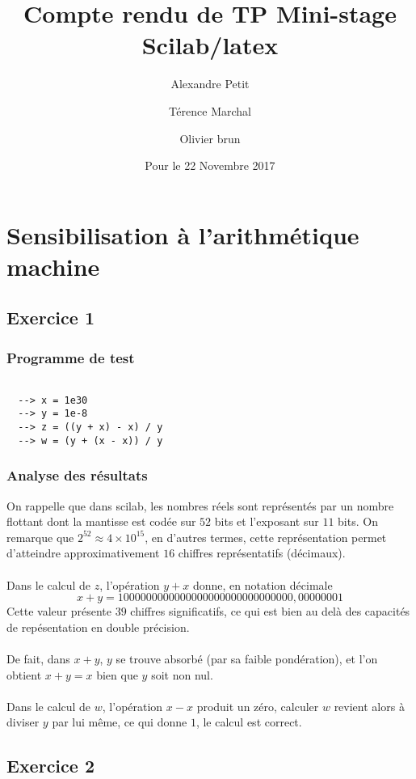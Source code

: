 \documentclass[a4paper,12pt]{article}
\title{Compte rendu de TP Mini-stage Scilab/latex}
\author{Alexandre Petit \and Térence Marchal \and Olivier brun }
\date{Pour le 22 Novembre 2017}
\begin{document}
\maketitle
\section{ Sensibilisation à l'arithmétique machine}
\subsection{ Exercice 1}

\subsubsection{Programme de test}
\begin{verbatim}

  --> x = 1e30
  --> y = 1e-8
  --> z = ((y + x) - x) / y
  --> w = (y + (x - x)) / y
\end{verbatim}

\subsubsection{Analyse des résultats}
On rappelle que dans scilab, les nombres réels sont représentés par un nombre flottant dont la mantisse est codée sur $52$ bits et l'exposant sur $11$ bits. On remarque que $2^{52} \approx 4 \times 10^{15}$, en d'autres termes, cette représentation permet d'atteindre approximativement $16$ chiffres représentatifs (décimaux). \\\\
Dans le calcul de $z$, l'opération $y + x$ donne, en notation décimale
$$
  x + y = 1000000000000000000000000000000,00000001
$$
\newline
Cette valeur présente $39$ chiffres significatifs, ce qui est bien au delà des capacités de repésentation en double précision.\\\\
De fait, dans $x + y$, $y$ se trouve absorbé (par sa faible pondération), et l'on obtient $x + y = x$ bien que $y$ soit non nul.\\\\
Dans le calcul de $w$, l'opération $x - x$ produit un zéro, calculer $w$ revient alors à diviser $y$ par lui même, ce qui donne $1$, le calcul est correct.

\subsection{ Exercice 2}
\end{document}
